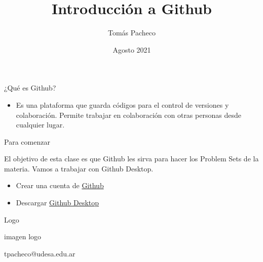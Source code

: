 \documentclass{beamer}					%
\title{Introducción a Github}
\author{Tom\'as Pacheco}
\institute{Econom\'ia Aplicada - Universidad de San Andr\'es}
\date{Agosto 2021}
\begin{document}
\begin{frame}
  \titlepage
\end{frame}

\begin{frame}{¿Qué es Github?}

\begin{itemize}
    \item Es una plataforma que guarda c\'odigos para el control de versiones y colaboraci\'on. Permite trabajar en colaboraci\'on con otras personas desde cualquier lugar. 
\end{itemize}
\end{frame}

\begin{frame}{Para comenzar}

El objetivo de esta clase es que Github les sirva para hacer los Problem Sets de la materia. Vamos a trabajar con Github Desktop.
\begin{itemize}
    \item Crear una cuenta de \href{https://bit.ly/3kuoEd4}{Github} 
    \item Descargar \href{https://desktop.github.com/}{Github Desktop}
\end{itemize}  
\end{frame}

\begin{frame}{Logo}

\begin{center}
imagen logo
\end{center}

\end{frame}



\begin{frame}{}
\begin{huge}
\begin{center}
    tpacheco@udesa.edu.ar
\end{center}
\end{huge}
\end{frame}
\end{document}
